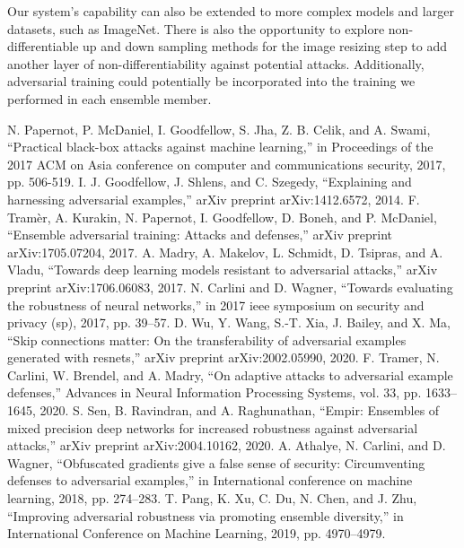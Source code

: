 \documentclass[10pt,journal,compsoc]{IEEEtran}
\begin{document}
Our system's capability can also be extended to more complex models and larger datasets, such as ImageNet. There is also the opportunity to explore non-differentiable up and down sampling methods for the image resizing step to add another layer of non-differentiability against potential attacks. Additionally, adversarial training could potentially be incorporated into the training we performed in each ensemble member. 




% 
%
\begin{thebibliography}{}
  N. Papernot, P. McDaniel, I. Goodfellow, S. Jha, Z. B. Celik, and A. Swami, “Practical black-box attacks against machine learning,” in Proceedings of the 2017 ACM on Asia conference on computer and communications security, 2017, pp. 506-519.
  I. J. Goodfellow, J. Shlens, and C. Szegedy, “Explaining and harnessing adversarial examples,” arXiv preprint arXiv:1412.6572, 2014.
  F. Tramèr, A. Kurakin, N. Papernot, I. Goodfellow, D. Boneh, and P. McDaniel, “Ensemble adversarial training: Attacks and defenses,” arXiv preprint arXiv:1705.07204, 2017.
  A. Madry, A. Makelov, L. Schmidt, D. Tsipras, and A. Vladu, “Towards deep learning models resistant to adversarial attacks,” arXiv preprint arXiv:1706.06083, 2017.
  N. Carlini and D. Wagner, “Towards evaluating the robustness of neural networks,” in 2017 ieee symposium on security and privacy (sp), 2017, pp. 39–57.
  D. Wu, Y. Wang, S.-T. Xia, J. Bailey, and X. Ma, “Skip connections matter: On the transferability of adversarial examples generated with resnets,” arXiv preprint arXiv:2002.05990, 2020.
  F. Tramer, N. Carlini, W. Brendel, and A. Madry, “On adaptive attacks to adversarial example defenses,” Advances in Neural Information Processing Systems, vol. 33, pp. 1633–1645, 2020.
  S. Sen, B. Ravindran, and A. Raghunathan, “Empir: Ensembles of mixed precision deep networks for increased robustness against adversarial attacks,” arXiv preprint arXiv:2004.10162, 2020.
  A. Athalye, N. Carlini, and D. Wagner, “Obfuscated gradients give a false sense of security: Circumventing defenses to adversarial examples,” in International conference on machine learning, 2018, pp. 274–283.
  T. Pang, K. Xu, C. Du, N. Chen, and J. Zhu, “Improving adversarial robustness via promoting ensemble diversity,” in International Conference on Machine Learning, 2019, pp. 4970–4979.

\end{thebibliography}
\end{document}
